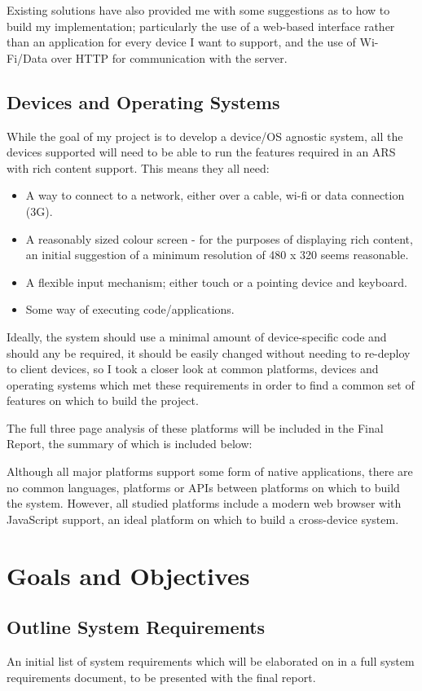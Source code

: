 \documentclass[a4papert,11pt,notitlepage]{ltxdoc}
\begin{document}
Existing solutions have also provided me with some suggestions as to how to build my implementation; particularly the use of a web-based interface rather than an application for every device I want to support, and the use of Wi-Fi/Data over HTTP for communication with the server.

\subsection{Devices and Operating Systems}
\label{sec:devices}
While the goal of my project is to develop a device/OS agnostic system, all the devices supported will need to be able to run the features required in an ARS with rich content support. This means they all need:
\begin{itemize}
\item A way to connect to a network, either over a cable, wi-fi or data connection (3G).
\item A reasonably sized colour screen - for the purposes of displaying rich content, an initial suggestion of a minimum resolution of 480 x 320 seems reasonable.
\item A flexible input mechanism; either touch or a pointing device and keyboard.
\item Some way of executing code/applications.
\end{itemize}

Ideally, the system should use a minimal amount of device-specific code and should any be required, it should be easily changed without needing to re-deploy to client devices, so I took a closer look at common platforms, devices and operating systems which met these requirements in order to find a common set of features on which to build the project.

The full three page analysis of these platforms will be included in the Final Report, the summary of which is included below:

Although all major platforms support some form of native applications, there are no common languages, platforms or APIs between platforms on which to build the system. However, all studied platforms include a modern web browser with JavaScript support, an ideal platform on which to build a cross-device system. 

\section{Goals and Objectives}
\subsection{Outline System Requirements}
An initial list of system requirements which will be elaborated on in a full system requirements document, to be presented with the final report.
\end{document}
